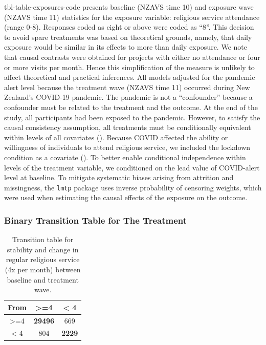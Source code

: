 \documentclass[
  single column]{article}
\begin{document}
tbl-table-exposures-code presents baseline (NZAVS time 10) and exposure
wave (NZAVS time 11) statistics for the exposure variable: religious
service attendance (range 0-8). Responses coded as eight or above were
coded as ``8''. This decision to avoid spare treatments was based on
theoretical grounds, namely, that daily exposure would be similar in its
effects to more than daily exposure. We note that causal contrasts were
obtained for projects with either no attendance or four or more visits
per month. Hence this simplification of the measure is unlikely to
affect theoretical and practical inferences. All models adjusted for the
pandemic alert level because the treatment wave (NZAVS time 11) occurred
during New Zealand's COVID-19 pandemic. The pandemic is not a
``confounder'' because a confounder must be related to the treatment and
the outcome. At the end of the study, all participants had been exposed
to the pandemic. However, to satisfy the causal consistency assumption,
all treatments must be conditionally equivalent within levels of all
covariates (). Because COVID affected the ability or willingness of
individuals to attend religious service, we included the lockdown
condition as a covariate (). To better enable conditional independence within levels of the
treatment variable, we conditioned on the lead value of COVID-alert
level at baseline. To mitigate systematic biases arising from attrition
and missingness, the \texttt{lmtp} package uses inverse probability of
censoring weights, which were used when estimating the causal effects of
the exposure on the outcome.

\subsubsection{Binary Transition Table for The
Treatment}\label{binary-transition-table-for-the-treatment}

\begin{longtable}[]{@{}ccc@{}}

\caption{\label{tbl-transition-tablegain}Transition table for stability
and change in regular religious service (4x per month) between baseline
and treatment wave.}

\tabularnewline

\toprule\noalign{}
From & \textgreater=4 & \textless{} 4 \\
\midrule\noalign{}
\endhead
\bottomrule\noalign{}
\endlastfoot
\textgreater=4 & \textbf{29496} & 669 \\
\textless{} 4 & 804 & \textbf{2229} \\

\end{longtable}
\end{document}
